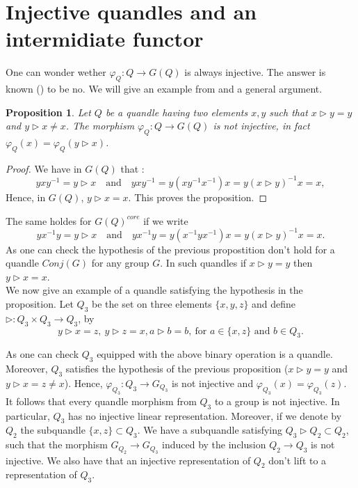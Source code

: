 \documentclass[12pt, reqno]{amsart}
\newtheorem{proposition}[theorem]{Proposition}
\begin{document}
\section{Injective quandles and an intermidiate functor}\label{S3}
One can wonder wether $\varphi_Q :Q\to G(Q)$ is always injective. The answer is known (\cite{DJ}) to be no. We will give an example from \cite{DJ} and a general argument.
\begin{proposition}
Let $Q$ be a quandle having two elements $x,y$ such that $x\triangleright y=y$ and $y\triangleright x\neq x$. The morphism $\varphi_Q :Q\to G(Q)$ is not injective, in fact $\varphi_Q(x)=\varphi_Q(y\triangleright x)$.
\end{proposition}
\begin{proof}
We have in $G(Q)$ that : 
$$yxy^{-1}=y\triangleright x \quad \text{and} \quad yxy^{-1}=y(xy^{-1}x^{-1})x=y(x\triangleright y)^{-1}x =x,$$
Hence, in $G(Q)$, $y\triangleright x=x$. This proves the proposition.
\end{proof}
The same holdes for $G(Q)^{core}$ if we write $$yx^{-1}y=y\triangleright x\quad \text{and} \quad yx^{-1}y=y(x^{-1}yx^{-1})x=y(x\triangleright y)^{-1}x =x.$$
As one can check the hypothesis of the previous propostition don't hold for a quandle $Conj(G)$ for any group $G$. In such quandles if $x\triangleright y=y$ then $y\triangleright x =x$.\\
We now give an example of a quandle satisfying the hypothesis in the proposition.
Let $Q_3$ be the set on three elements $\{x,y,z\}$ and define $\triangleright :Q_3 \times Q_3\to Q_3$, by 
$$ y  \triangleright  x=z , \ y\triangleright z =x , a\triangleright  b=b, \  \text{for $a\in\{x,z\}$ and $b\in Q_3$}.$$

As one can check $Q_3$ equipped with the above binary operation is a quandle. Moreover, $Q_3$ satisfies the hypothesis of the previous proposition ($x\triangleright y=y$ and $y\triangleright x=z\neq x$). Hence, $\varphi_{Q_3}: Q_3 \to G_{Q_3}$ is not injective and $\varphi_{Q_3}(x)=\varphi_{Q_3}(z)$. It follows that every quandle morphism from $Q_3$ to a group is not injective. In particular, $Q_3$ has no injective linear representation. Moreover, if we denote by $Q_2$ the subquandle $\{x,z\}\subset Q_3$. We have a  subquandle satisfying $Q_3\triangleright Q_2 \subset Q_2$, such that the morphism $G_{Q_2}\to G_{Q_3}$ induced by the inclusion $Q_2\to Q_3$ is not injective. We also have that an injective representation of $Q_2$ don't lift to a representation of $Q_3$.  
\end{document}
